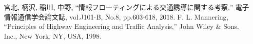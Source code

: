 \documentclass[twocolumn,a4paper,dvipdfmx]{ieicejsp}
\begin{document}
\begin{thebibliography}{99}
  宮北, 柄沢, 稲川, 中野, “情報フローティングによる交通誘導に関する考察,” 電子情報通信学会論文誌, vol.J101-B, No.8, pp.603-618, 2018.
  F. L. Mannering, “Principles of Highway Engineering and Traffic Analysis,” John Wiley \& Sons, Inc., New York, NY, USA, 1998.
\end{thebibliography}
\end{document}
